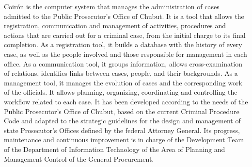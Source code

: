 
Coirón is the computer system that manages the administration of cases admitted to the Public Prosecutor's Office of Chubut. 
It is a tool that allows the registration, communication and management of activities, procedures and actions that are carried out for a criminal case, from the initial charge to its final completion.
As a registration tool, it builds a database with the history of every case, as well as the people involved and those responsible for management in each office. 
As a communication tool, it groups information, allows cross-examination of relations, identifies links between cases, people, and their backgrounds. 
As a management tool, it manages the evolution of cases and the corresponding work of the officials. 
It allows planning, organizing, coordinating and controlling the workflow related to each case.
It has been developed according to the needs of the Public Prosecutor's Office of Chubut, based on the current Criminal Procedure Code and adapted to the strategic guidelines for the design and management of state Prosecutor's Offices defined by the federal Attorney General. 
Its progress, maintenance and continuous improvement is in charge of the Development Team of the Department of Information Technology of the Area of Planning and Management Control of the General Procurement.

